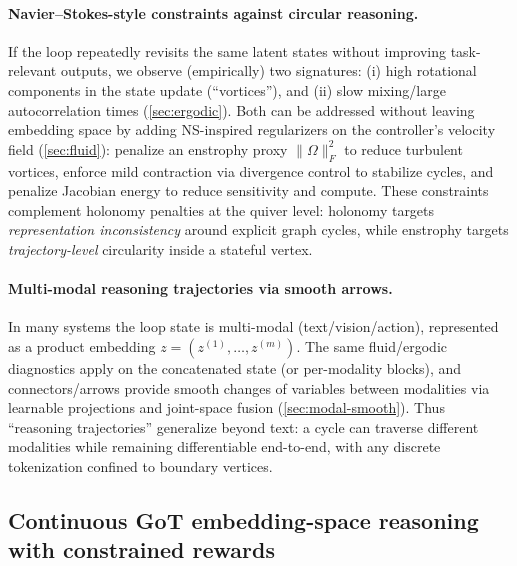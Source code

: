 \documentclass[11pt]{article}
\theoremstyle{definition}
\theoremstyle{plain}
\theoremstyle{remark}
\begin{document}
\paragraph{Navier--Stokes-style constraints against circular reasoning.}
If the loop repeatedly revisits the same latent states without improving task-relevant outputs, we observe (empirically) two signatures:
(i) high rotational components in the state update (``vortices''), and
(ii) slow mixing/large autocorrelation times (\cref{sec:ergodic}).
Both can be addressed without leaving embedding space by adding NS-inspired regularizers on the controller's velocity field (\cref{sec:fluid}):
penalize an enstrophy proxy $\|\Omega\|_F^2$ to reduce turbulent vortices, enforce mild contraction via divergence control to stabilize cycles, and penalize Jacobian energy to reduce sensitivity and compute.
These constraints complement holonomy penalties at the quiver level: holonomy targets \emph{representation inconsistency} around explicit graph cycles, while enstrophy targets \emph{trajectory-level} circularity inside a stateful vertex.

\paragraph{Multi-modal reasoning trajectories via smooth arrows.}
In many systems the loop state is multi-modal (text/vision/action), represented as a product embedding $z=(z^{(1)},\ldots,z^{(m)})$.
The same fluid/ergodic diagnostics apply on the concatenated state (or per-modality blocks), and connectors/arrows provide smooth changes of variables between modalities via learnable projections and joint-space fusion (\cref{sec:modal-smooth}).
Thus ``reasoning trajectories'' generalize beyond text: a cycle can traverse different modalities while remaining differentiable end-to-end, with any discrete tokenization confined to boundary vertices.

\subsection{Continuous GoT embedding-space reasoning with constrained rewards}
\label{sec:got-constrained}
\end{document}

